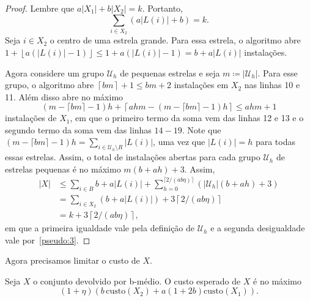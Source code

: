 \begin{proof}
    Lembre que $a|X_1| + b|X_2| = k$. Portanto,
    \begin{equation}
        \sum_{i \in X_2}(a|L(i)| + b) = k. \label{pseudo:3}
    \end{equation}
    Seja $i \in X_2$ o centro de uma estrela grande. %
    Para essa estrela, o algoritmo abre ${1 + \left \lfloor a(|L(i)| - 1) \right \rfloor \leq 1 + a(|L(i)| - 1) = b + a|L(i)|}$ instalações.

    Agora considere um grupo $\mathcal{U}_h$ de pequenas estrelas e seja $m \coloneqq |\mathcal{U}_h|$. Para esse grupo, o algoritmo abre $\left \lceil bm \right \rceil + 1 \leq bm + 2 $ instalações em $X_2$ nas linhas 10 e 11. Além disso abre no máximo 
    \begin{equation}
        (m - \lceil bm \rceil -1 ) h + \left \lceil ahm - (m - \lceil bm \rceil - 1)h \right \rceil \leq ahm + 1 \nonumber
    \end{equation}
    instalações de $X_1$, em que o primeiro termo da soma vem das linhas 12 e 13 e o segundo termo da soma vem das linhas $14 - 19$. Note que $(m - \lceil bm \rceil - 1)h = \sum_{i \in \mathcal{U}_h \setminus R} |L(i)|$, uma vez que $|L(i)| = h$ para todas essas estrelas. Assim, o total de instalações abertas para cada grupo $\mathcal{U}_h$ de estrelas pequenas é no máximo $m (b + ah) + 3$. Assim,
    \begin{align}
        |X| &\leq \sum_{i \in B} b + a|L(i)| + \sum_{h = 0}^{\lceil 2/(ab\eta)\rceil} \left( |\mathcal{U}_h| (b + ah) + 3 \right) \nonumber \\
        & = \sum_{i \in X_2 } (b + a |L(i)|) + 3 \left \lceil 2/(ab\eta) \right \rceil \nonumber \\
        & = k + 3 \left \lceil 2/(ab\eta) \right \rceil \nonumber,
    \end{align}
    em que a primeira igualdade vale pela definição de $\mathcal{U}_h$ e a segunda desigualdade vale por~\eqref{pseudo:3}.
\end{proof}

Agora precisamos limitar o custo de $X$.

\begin{lemma} \label{lemma:5.11}
    Seja $X$ o conjunto devolvido por {\sc b-médio}. O custo esperado de $X$ é no máximo 
    \[( 1 + \eta) (b\, \mathrm{custo}(X_2) + a (1 + 2b)\mathrm{custo}(X_1)).\]
\end{lemma}

